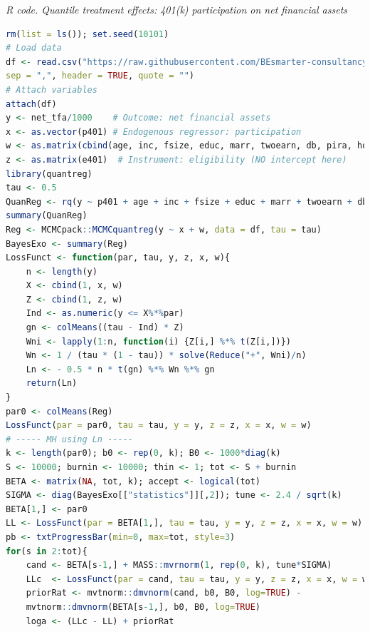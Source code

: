 \begin{tcolorbox}[enhanced,width=4.67in,center upper,
	fontupper=\large\bfseries,drop shadow southwest,sharp corners]
	\textit{R code. Quantile treatment effects: 401(k) participation on net financial assets}
	\begin{VF}
		\begin{lstlisting}[language=R]	
rm(list = ls()); set.seed(10101)
# Load data
df <- read.csv("https://raw.githubusercontent.com/BEsmarter-consultancy/BSTApp/refs/heads/master/DataApp/401k.csv",
sep = ",", header = TRUE, quote = "")
# Attach variables
attach(df)
y <- net_tfa/1000    # Outcome: net financial assets
x <- as.vector(p401) # Endogenous regressor: participation
w <- as.matrix(cbind(age, inc, fsize, educ, marr, twoearn, db, pira, hown))  # Exogenous regressors
z <- as.matrix(e401)  # Instrument: eligibility (NO intercept here)
library(quantreg)
tau <- 0.5 
QuanReg <- rq(y ~ p401 + age + inc + fsize + educ + marr + twoearn + db + pira + hown, tau = tau, data = df)
summary(QuanReg)
Reg <- MCMCpack::MCMCquantreg(y ~ x + w, data = df, tau = tau)
BayesExo <- summary(Reg)
LossFunct <- function(par, tau, y, z, x, w){
	n <- length(y)
	X <- cbind(1, x, w)
	Z <- cbind(1, z, w)
	Ind <- as.numeric(y <= X%*%par) 
	gn <- colMeans((tau - Ind) * Z)
	Wni <- lapply(1:n, function(i) {Z[i,] %*% t(Z[i,])}) 
	Wn <- 1 / (tau * (1 - tau)) * solve(Reduce("+", Wni)/n)
	Ln <- - 0.5 * n * t(gn) %*% Wn %*% gn
	return(Ln)
}
par0 <- colMeans(Reg)
LossFunct(par = par0, tau = tau, y = y, z = z, x = x, w = w)
# ----- MH using Ln -----
k <- length(par0); b0 <- rep(0, k); B0 <- 1000*diag(k)
S <- 10000; burnin <- 10000; thin <- 1; tot <- S + burnin
BETA <- matrix(NA, tot, k); accept <- logical(tot)
SIGMA <- diag(BayesExo[["statistics"]][,2]); tune <- 2.4 / sqrt(k)
BETA[1,] <- par0
LL <- LossFunct(par = BETA[1,], tau = tau, y = y, z = z, x = x, w = w)
pb <- txtProgressBar(min=0, max=tot, style=3)
for(s in 2:tot){
	cand <- BETA[s-1,] + MASS::mvrnorm(1, rep(0, k), tune*SIGMA)
	LLc  <- LossFunct(par = cand, tau = tau, y = y, z = z, x = x, w = w)
	priorRat <- mvtnorm::dmvnorm(cand, b0, B0, log=TRUE) -
	mvtnorm::dmvnorm(BETA[s-1,], b0, B0, log=TRUE)
	loga <- (LLc - LL) + priorRat
\end{lstlisting}
	\end{VF}
\end{tcolorbox} 

